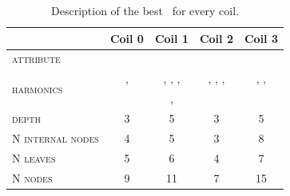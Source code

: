 \begin{table}[!ht]
	\caption{Description of the best \dt\ for every coil.}\label{tbl:tree-description}

	\bigskip
	\setlength{\tabcolsep}{6pt}
	\centering
	\begin{tabular}{lcccc}
		\toprule
		\textbf{}                           & \textbf{Coil 0}  & \textbf{Coil 1}          & \textbf{Coil 2}          & \textbf{Coil 3}
		\\
		\midrule
		\textsc{attribute}                  & \an              & \bn                      & \an                      & \cnmod                          \\
		\multirow{2}{*}{\textsc{harmonics}} & \an[2], \an[3]   & \bn[3], \bn[4], \bn[10], & \an[1], \an[2], \an[12], & \cnmod[1], \cnmod[6], \cnmod[7] \\
		                                    &
		                                    & \bn[11], \bn[13] & \an[15]                  &                                                            \\
		\textsc{depth}                      & 3                & 5
		                                    & 3                & 5                                                                                     \\
		\textsc{N internal nodes}           & 4                & 5
		                                    & 3                & 8                                                                                     \\
		\textsc{N leaves}                   & 5                & 6
		                                    & 4                & 7                                                                                     \\
		\textsc{N nodes}                    & 9                & 11
		                                    & 7                & 15                                                                                    \\
		\bottomrule
	\end{tabular}
\end{table}

